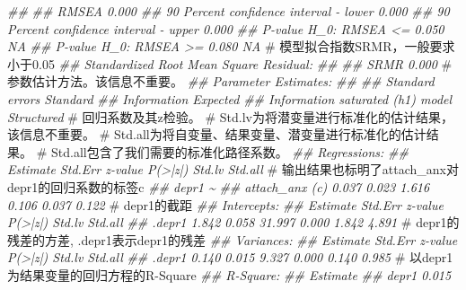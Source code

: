 \documentclass[
  chinese-hans,
  letterpaper,
  DIV=11,
  numbers=noendperiod]{scrartcl}
\newenvironment{Shaded}{\begin{snugshade}}{\end{snugshade}}
\newcommand{\CommentTok}[1]{\textcolor[rgb]{0.37,0.37,0.37}{#1}}
\newcommand{\DocumentationTok}[1]{\textcolor[rgb]{0.37,0.37,0.37}{\textit{#1}}}
\begin{document}
\begin{Shaded}
\begin{Highlighting}[numbers=left,,]
\DocumentationTok{\#\# }
\DocumentationTok{\#\#   RMSEA                                          0.000}
\DocumentationTok{\#\#   90 Percent confidence interval {-} lower         0.000}
\DocumentationTok{\#\#   90 Percent confidence interval {-} upper         0.000}
\DocumentationTok{\#\#   P{-}value H\_0: RMSEA \textless{}= 0.050                       NA}
\DocumentationTok{\#\#   P{-}value H\_0: RMSEA \textgreater{}= 0.080                       NA}
\CommentTok{\# 模型拟合指数SRMR，一般要求小于0.05}
\DocumentationTok{\#\# Standardized Root Mean Square Residual:}
\DocumentationTok{\#\# }
\DocumentationTok{\#\#   SRMR                                           0.000}
\CommentTok{\# 参数估计方法。该信息不重要。}
\DocumentationTok{\#\# Parameter Estimates:}
\DocumentationTok{\#\# }
\DocumentationTok{\#\#   Standard errors                             Standard}
\DocumentationTok{\#\#   Information                                 Expected}
\DocumentationTok{\#\#   Information saturated (h1) model          Structured}
\CommentTok{\# 回归系数及其z检验。 }
\CommentTok{\# Std.lv为将潜变量进行标准化的估计结果，该信息不重要。}
\CommentTok{\# Std.all为将自变量、结果变量、潜变量进行标准化的估计结果。}
\CommentTok{\# Std.all包含了我们需要的标准化路径系数。}
\DocumentationTok{\#\# Regressions:}
\DocumentationTok{\#\#                    Estimate  Std.Err  z{-}value  P(\textgreater{}|z|)   Std.lv  Std.all}
\CommentTok{\# 输出结果也标明了attach\_anx对depr1的回归系数的标签c}
\DocumentationTok{\#\#  depr1 \textasciitilde{}                                                               }
\DocumentationTok{\#\#     attach\_anx (c)    0.037    0.023    1.616    0.106    0.037    0.122}
\CommentTok{\# depr1的截距}
\DocumentationTok{\#\# Intercepts:}
\DocumentationTok{\#\#                    Estimate  Std.Err  z{-}value  P(\textgreater{}|z|)   Std.lv  Std.all}
\DocumentationTok{\#\#    .depr1             1.842    0.058   31.997    0.000    1.842    4.891}
\CommentTok{\# depr1的残差的方差, \textasciigrave{}.depr1\textasciigrave{}表示depr1的残差}
\DocumentationTok{\#\# Variances:}
\DocumentationTok{\#\#                    Estimate  Std.Err  z{-}value  P(\textgreater{}|z|)   Std.lv  Std.all}
\DocumentationTok{\#\#    .depr1             0.140    0.015    9.327    0.000    0.140    0.985}
\CommentTok{\# 以depr1为结果变量的回归方程的R{-}Square}
\DocumentationTok{\#\# R{-}Square:}
\DocumentationTok{\#\#                    Estimate}
\DocumentationTok{\#\#     depr1             0.015}
\end{Highlighting}
\end{Shaded}
\end{document}

